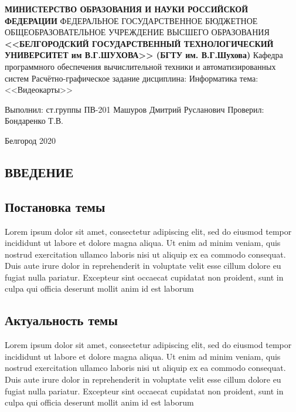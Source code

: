 \documentclass{article}
\def\l{\linebreak}
\begin{document}
\thispagestyle{empty}

\begin{center}
    \textbf{МИНИСТЕРСТВО ОБРАЗОВАНИЯ И НАУКИ
    РОССИЙСКОЙ ФЕДЕРАЦИИ} \l
    ФЕДЕРАЛЬНОЕ ГОСУДАРСТВЕННОЕ БЮДЖЕТНОЕ ОБЩЕОБРАЗОВАТЕЛЬНОЕ УЧРЕЖДЕНИЕ
    ВЫСШЕГО ОБРАЗОВАНИЯ \l
    \textbf{<<БЕЛГОРОДСКИЙ ГОСУДАРСТВЕННЫЙ
    ТЕХНОЛОГИЧЕСКИЙ УНИВЕРСИТЕТ им В.Г.ШУХОВА>> \l
    (БГТУ им. В.Г.Шухова)}
    \l \l \l
    Кафедра программного обеспечения вычислительной техники и 
    автоматизированных систем
    \l \l \l \l
    Расчётно-графическое задание \l
    дисциплина: Информатика \l
    тема: <<Видеокарты>> \l
\end{center}
\hfill
\begin{flushright}
    Выполнил: ст.группы ПВ-201 \l
    Машуров Дмитрий Русланович \l
    Проверил: Бондаренко Т.В. \l
\end{flushright}
\vfill
\begin{center}
    Белгород 2020
\end{center}


\newpage
\thispagestyle{empty}


\newpage
\setcounter{page}{1}

\begin{center}
    \section*{\Large\textbf{ВВЕДЕНИЕ}}
\end{center}

\subsection*{Постановка темы}
Lorem ipsum dolor sit amet, consectetur adipiscing elit, sed do eiusmod tempor incididunt ut labore et dolore magna aliqua. Ut enim ad minim veniam, quis nostrud exercitation ullamco laboris nisi ut aliquip ex ea commodo consequat. Duis aute irure dolor in reprehenderit in voluptate velit esse cillum dolore eu fugiat nulla pariatur. Excepteur sint occaecat cupidatat non proident, sunt in culpa qui officia deserunt mollit anim id est laborum

\subsection*{Актуальность темы}
Lorem ipsum dolor sit amet, consectetur adipiscing elit, sed do eiusmod tempor incididunt ut labore et dolore magna aliqua. Ut enim ad minim veniam, quis nostrud exercitation ullamco laboris nisi ut aliquip ex ea commodo consequat. Duis aute irure dolor in reprehenderit in voluptate velit esse cillum dolore eu fugiat nulla pariatur. Excepteur sint occaecat cupidatat non proident, sunt in culpa qui officia deserunt mollit anim id est laborum
\end{document}
